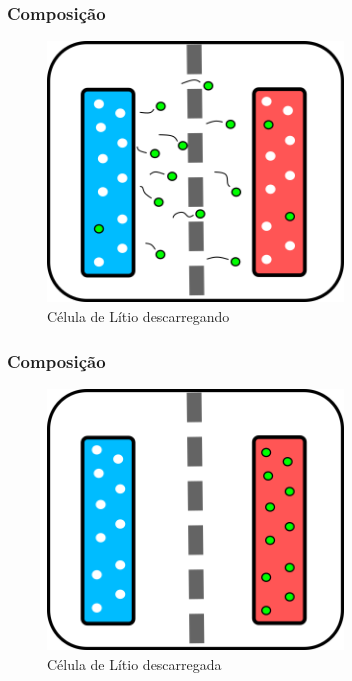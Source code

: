 \documentclass{beamer}
\begin{document}
\begin{frame}\frametitle{Composição}
	
\begin{figure}[h]
	\centering
	\includegraphics[width=0.70\textwidth]{battery-discharging}
	\caption{Célula de Lítio descarregando}
	\label{fig:battery-discharging}
\end{figure}
\end{frame}		

\begin{frame}\frametitle{Composição}
	
\begin{figure}[h]
	\centering
	\includegraphics[width=0.70\textwidth]{battery-discharged}
	\caption{Célula de Lítio descarregada}
	\label{fig:battery-discharged}
\end{figure}
\end{frame}		
\end{document}
